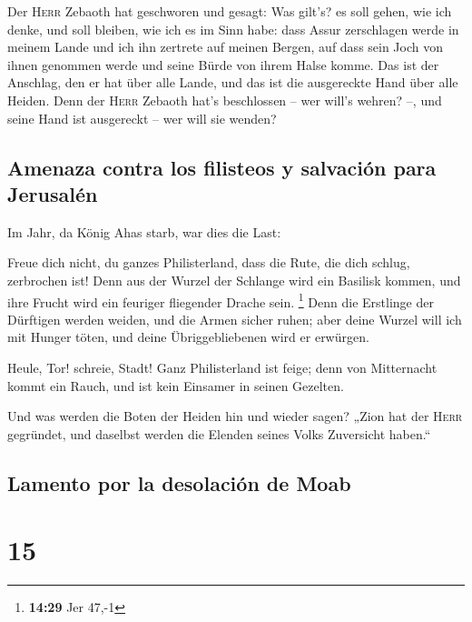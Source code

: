  Der \textsc{Herr} Zebaoth hat geschworen und gesagt: Was
gilt's? es soll gehen, wie ich denke, und soll bleiben, wie ich es im
Sinn habe:  dass Assur zerschlagen werde in meinem Lande
und ich ihn zertrete auf meinen Bergen, auf dass sein Joch von ihnen
genommen werde und seine Bürde von ihrem Halse komme. 
Das ist der Anschlag, den er hat über alle Lande, und das ist die
ausgereckte Hand über alle Heiden.  Denn der
\textsc{Herr} Zebaoth hat's beschlossen -- wer will's wehren? --, und
seine Hand ist ausgereckt -- wer will sie wenden?

\hypertarget{amenaza-contra-los-filisteos-y-salvaciuxf3n-para-jerusaluxe9n}{%
\subsection{Amenaza contra los filisteos y salvación para
Jerusalén}\label{amenaza-contra-los-filisteos-y-salvaciuxf3n-para-jerusaluxe9n}}

 Im Jahr, da König Ahas starb, war dies die Last:

 Freue dich nicht, du ganzes Philisterland, dass die
Rute, die dich schlug, zerbrochen ist! Denn aus der Wurzel der Schlange
wird ein Basilisk kommen, und ihre Frucht wird ein feuriger fliegender
Drache sein. \footnote{\textbf{14:29} Jer 47,-1}  Denn
die Erstlinge der Dürftigen werden weiden, und die Armen sicher ruhen;
aber deine Wurzel will ich mit Hunger töten, und deine Übriggebliebenen
wird er erwürgen.

 Heule, Tor! schreie, Stadt! Ganz Philisterland ist
feige; denn von Mitternacht kommt ein Rauch, und ist kein Einsamer in
seinen Gezelten.

 Und was werden die Boten der Heiden hin und wieder
sagen? „Zion hat der \textsc{Herr} gegründet, und daselbst werden die
Elenden seines Volks Zuversicht haben.``

\hypertarget{lamento-por-la-desolaciuxf3n-de-moab}{%
\subsection{Lamento por la desolación de
Moab}\label{lamento-por-la-desolaciuxf3n-de-moab}}

\hypertarget{section-14}{%
\section{15}\label{section-14}}

